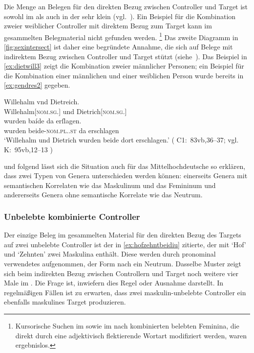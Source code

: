 Die Menge an Belegen für den direkten Bezug zwischen Controller und Target ist
sowohl im \CAO{} als auch in der \KC{} sehr klein
(vgl.~). Ein Beispiel für
die Kombination zweier weiblicher Controller mit direktem Bezug zum Target kann
im gesammelten Belegmaterial nicht gefunden werden.%
%
	\footnote{Kursorische Suchen im \CAO{} sowie im \REM{} nach kombinierten
	belebten Feminina, die direkt durch eine adjektivisch flektierende Wortart
	modifiziert werden, waren ergebnislos.}
%
Das zweite Diagramm in \cref{fig:sexintersect} ist daher eine begründete
Annahme, die sich auf Belege mit indirektem Bezug zwischen Controller und
Target stützt (siehe~). Das Beispiel in
\cref{ex:dietwill3} zeigt die Kombi\-nation zweier männlicher Personen; ein
Beispiel für die Kombination einer männlichen und einer weiblichen Person wurde
bereits in \cref{ex:gendres2} gegeben.

\begin{exe}
\ex\label{ex:dietwill3}
		\gll Willehalm vnd Dietreich. \\
			Willehalm[\textsc{nom.sg.\MascM}] und Dietrich[\textsc{nom.sg.\MascM}] \\
	\sn \gll wurden baíde da erſlagen. \\
			wurden beide-\textsc{nom.pl.\MascM.st} da erschlagen \\
		\trans `Willehalm und Dietrich wurden beide dort erschlagen.'
			(%
				C1:~83vb,36--37; vgl.
				K:~95vb,12--13%
			)
\end{exe}

\citet[576]{wechsler2009} und \citet[182]{wechslerzlatic2003} folgend lässt
sich die Situation auch für das Mittelhochdeutsche so erklären, dass zwei Typen
von Genera unterschieden werden können: einerseits Genera mit semantischen
Korrelaten wie das Maskulinum und das Femininum und andererseits Genera ohne
semantische Korrelate wie das Neutrum.

\subsubsection{Unbelebte kombinierte Controller}
\label{subsubsec:x+x_dir_inan}

Der einzige Beleg im gesammelten Material für den direkten Bezug des Targets
auf zwei unbelebte Controller ist der in \cref{ex:hofzehntbeidiu} zitierte, der
mit  `Hof' und  `Zehnten' zwei Maskulina enthält. Diese
werden durch pronominal verwendetes  aufgenommen, der Form nach ein
Neutrum. Dasselbe Muster zeigt sich beim indirekten Bezug zwischen Controllern
und Target noch weitere vier Male im \CAO{}. Die Frage ist, inwiefern dies
Regel oder Ausnahme darstellt. In regelmäßigen Fällen ist zu erwarten, dass
zwei maskulin-unbelebte Controller ein ebenfalls maskulines Target produzieren.


